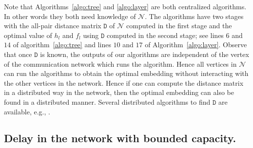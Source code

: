 \documentclass[journal]{IEEEtran}
\newcommand{\net}{\mathcal{N}}
\begin{document}
Note that Algorithms~\ref{algo:tree} and \ref{algo:layer} are both
centralized algorithms. In other words they both need knowledge of
$\net.$ The algorithms have two stages with the all-pair distance
matrix $\mathtt{D}$ of $\net$ computed in the first stage and the
optimal value of $h_l$ and $f_l$ using $\mathtt{D}$ computed in the
second stage; see lines $6$ and $14$ of algorithm~\ref{algo:tree} and
lines $10$ and $17$ of Algorithm~\ref{algo:layer}.  Observe that once
$\mathtt{D}$ is known, the outputs of our algorithms are independent
of the vertex of the communication network which runs the
algorithm. Hence all vertices in $\net$ can run the algorithms to
obtain the optimal embedding without interacting with the other
vertices in the network. Hence if one can compute the distance matrix
in a distributed way in the network, then the optimal embedding can
also be found in a distributed manner. Several distributed algorithms
to find $\mathtt{D}$ are available, e.g., \cite{Kanchi04}.

\subsection{Delay in the network with bounded capacity.}
\end{document}
